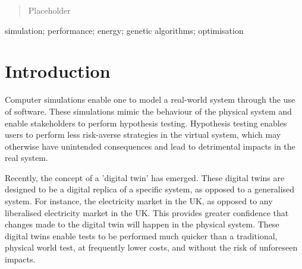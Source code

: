 \documentclass[10pt, conference, compsocconf]{IEEEtran}
\begin{document}




\maketitle

\begin{abstract}
Placeholder

\end{abstract}

\begin{IEEEkeywords}
simulation; performance; energy; genetic algorithms; optimisation

\end{IEEEkeywords}


%
\IEEEpeerreviewmaketitle


\section{Introduction}

Computer simulations enable one to model a real-world system through the use of software. These simulations mimic the behaviour of the physical system and enable stakeholders to perform hypothesis testing. Hypothesis testing enables users to perform less risk-averse strategies in the virtual system, which may otherwise have unintended consequences and lead to detrimental impacts in the real system. 

Recently, the concept of a 'digital twin' has emerged. These digital twins are designed to be a digital replica of a specific system, as opposed to a generalised system. For instance, the electricity market in the UK, as opposed to any liberalised electricity market in the UK. This provides greater confidence that changes made to the digital twin will happen in the physical system. These digital twins enable tests to be performed much quicker than a traditional, physical world test, at frequently lower costs, and without the risk of unforeseen impacts. 
\end{document}

